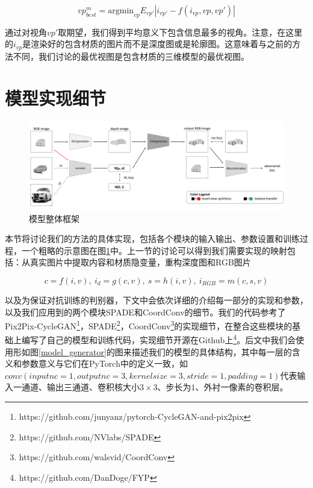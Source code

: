 \documentclass[UTF8,openany,AutoFakeBold,AutoFakeSlant,cs4size]{ctexbook}
\begin{document}
\begin{equation}
	vp_{best}^{m} = \mbox{argmin}_{vp} E_{vp'} | i_{vp'} - f(i_{vp}, vp, vp')|
\end{equation}


通过对视角$vp'$取期望，我们得到平均意义下包含信息最多的视角。注意，在这里的$i_{vp}$是渲染好的包含材质的图片而不是深度图或是轮廓图。这意味着与之前的方法不同，我们讨论的最优视图是包含材质的三维模型的最优视图。

\section{模型实现细节}

\begin{figure}
\centering
\includegraphics[width=\linewidth]{./images/banner.png}
\caption{模型整体框架}
\label{model_architecture}
\end{figure}

本节将讨论我们的方法的具体实现，包括各个模块的输入输出、参数设置和训练过程，一个粗略的示意图在图\ref{model_architecture}中。上一节的讨论可以得到我们需要实现的映射包括：从真实图片中提取内容和材质隐变量，重构深度图和RGB图片

\begin{equation}
	c = f(i, v),\ i_d = g(c, v),\ s = h(i ,v),\ i_{RGB} = m(c, s, v)
\end{equation}

以及为保证对抗训练的判别器，下文中会依次详细的介绍每一部分的实现和参数，以及我们应用到的两个模块SPADE\cite{park2019SPADE}和CoordConv\cite{NIPS2018_8169}的细节。我们的代码参考了Pix2Pix-CycleGAN\footnote{https://github.com/junyanz/pytorch-CycleGAN-and-pix2pix}，SPADE\footnote{https://github.com/NVlabs/SPADE}，CoordConv\footnote{https://github.com/walsvid/CoordConv}的实现细节，在整合这些模块的基础上编写了自己的模型和训练代码，实现细节开源在Github上\footnote{https://github.com/DanDoge/FYP}。后文中我们会使用形如图\ref{model_generator}的图来描述我们的模型的具体结构，其中每一层的含义和参数意义与它们在PyTorch\cite{NEURIPS2019_9015}中的定义一致，如$conv(inputnc=1, outputnc=3, kernelsize=3, stride=1, padding=1)$代表输入一通道、输出三通道、卷积核大小$3 \times 3$、步长为$1$、外衬一像素的卷积层。
\end{document}
